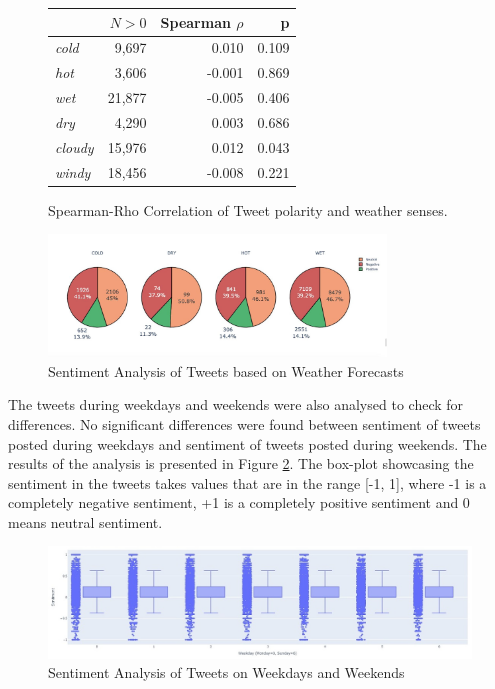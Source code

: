 \documentclass[a4paper,10pt]{article}
\begin{document}
    \begin{figure}
        \begin{tabular}{l | r r r }
        \hline
        & \textbf{$N > 0$} & \textbf{Spearman $\rho$} & \textbf{p} \\
        \hline
        \textit{cold} & 9,697 & 0.010 & 0.109 \\
        \textit{hot} & 3,606 & -0.001 & 0.869 \\
        \textit{wet} & 21,877 & -0.005 & 0.406 \\
        \textit{dry} & 4,290 & 0.003 & 0.686 \\
        \textit{cloudy} & 15,976 & 0.012 & 0.043 \\
        \textit{windy} & 18,456 & -0.008 & 0.221 \\
        \end{tabular}
        \caption{Spearman-Rho Correlation of Tweet polarity and weather senses.}
    \end{figure}

   \begin{figure}
        \includegraphics[width=0.8\textwidth]{analysis_sentiment_weather.jpg}
        \caption{Sentiment Analysis of Tweets based on Weather Forecasts}
        \label{fig:analysis_sentiment_weather}
    \end{figure}
    The tweets during weekdays and weekends were also analysed to check for differences. No significant differences were found between sentiment of tweets posted during weekdays and sentiment of tweets posted during weekends. The results of the analysis is presented in Figure \ref{fig:sentiment_weekdays_weekends}. The box-plot showcasing the sentiment in the tweets takes values that are in the range [-1, 1], where -1 is a completely negative sentiment, +1 is a completely positive sentiment and 0 means neutral sentiment.
    \begin{figure}
        \includegraphics[width=1\textwidth]{sentiment_analysis_weekdays_weekends.jpg}
        \caption{Sentiment Analysis of Tweets on Weekdays and Weekends}
        \label{fig:sentiment_weekdays_weekends}
    \end{figure} 
   
\end{document}
